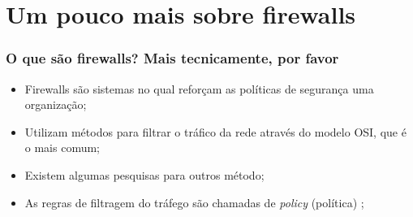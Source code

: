 \section{Um pouco mais sobre firewalls}

\begin{frame}
	\frametitle{O que são firewalls? Mais tecnicamente, por favor}

	\begin{itemize}
		\item Firewalls são sistemas no qual reforçam as políticas de segurança uma organização;
		\item Utilizam métodos para filtrar o tráfico da rede através do modelo OSI, que é o mais comum;
		\item Existem algumas pesquisas para outros método;
		\item As regras de filtragem do tráfego são chamadas de \textit{policy} (política) \cite{history};

	\end{itemize}
\end{frame}
